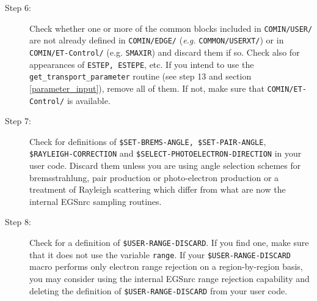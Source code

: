 \begin{description}

\item[Step 6:]
Check whether one or more of the common blocks
included in {\tt COMIN/USER/} are
not already defined in {\tt COMIN/EDGE/} ({\em e.g.} {\tt COMMON/USERXT/})
or in {\tt COMIN/ET-Control/} (e.g. {\tt SMAXIR}) and discard them if so.
Check also for appearances of {\tt ESTEP, ESTEPE}, etc.
If you intend to use the {\tt get\_transport\_parameter} routine
(see step 13 and section \ref{parameter_input}), remove all
of them. If not, make sure that {\tt COMIN/ET-Control/} is
available.


\item[Step 7:]
Check for definitions of {\tt \$SET-BREMS-ANGLE, \$SET-PAIR-ANGLE},
\\{\tt \$RAYLEIGH-CORRECTION} and  {\tt \$SELECT-PHOTOELECTRON-DIRECTION}
in your user code.
Discard them unless you are using angle selection schemes
for bremsstrahlung, pair production or photo-electron production or
a treatment of Rayleigh scattering which differ from what are now the
internal EGSnrc sampling routines.

\item [Step 8:]
Check for a definition of {\tt \$USER-RANGE-DISCARD}.
If you find one, make sure that it does not use
the variable {\tt range}. If your {\tt \$USER-RANGE-DISCARD}
macro performs only electron range rejection on a region-by-region
basis, you may consider using the internal EGSnrc range rejection
capability and deleting the definition of {\tt \$USER-RANGE-DISCARD}
from your user code.


\end{description}
